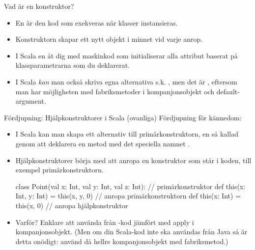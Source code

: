 \begin{Slide}{Vad är en konstruktor?}
\begin{itemize}
\item En  är den kod som exekveras när klasser instansieras.

\item Konstruktorn skapar ett nytt objekt i minnet vid varje anrop.

\item I Scala  en  åt dig med maskinkod som initialiserar alla attribut baserat på klassparametrarna som du deklarerat.

\pause


\item I Scala \emph{kan} man också skriva egna alternativa s.k.  , men det är , eftersom man har möjligheten med fabriksmetoder i kompanjonsobjekt och default-argument.
\end{itemize}
\end{Slide}


\begin{Slide}{Fördjupning: Hjälpkonstruktorer i Scala (ovanliga)}\SlideFontTiny
Fördjupning för kännedom:
\begin{itemize}
\item I Scala kan man skapa ett alternativ till primärkonstruktorn, en så kallad   genom att deklarera en metod med det speciella namnet .


\item Hjälpkonstruktorer  börja med att anropa en  konstruktor som står  i koden, till exempel primärkonstruktorn.

\begin{Code}
class Point(val x: Int, val y: Int, val z: Int): // primärkonstruktor
  def this(x: Int, y: Int) = this(x, y, 0) // anropa primärkonstruktorn
  def this(x: Int) = this(x, 0) // anropa hjälpkonstruktor
\end{Code}
\item Varför? Enklare att använda från -kod jämfört med apply i kompanjonsobjekt. (Men om din Scala-kod inte ska användas från Java så är detta onödigt: använd då hellre kompanjonsobjekt med fabriksmetod.)

\end{itemize}

\end{Slide}

